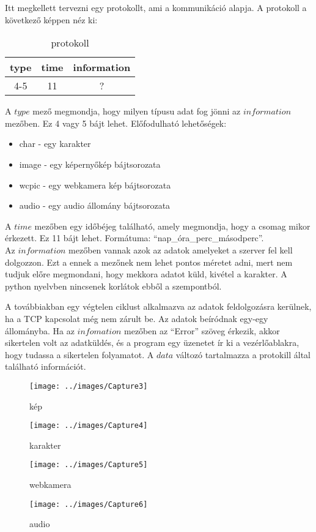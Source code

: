 \documentclass[a4paper, 11pt]{article}
\begin{document}
Itt megkellett tervezni egy protokollt, ami a kommunikáció alapja. A protokoll a következő képpen néz ki:
\begin{table}[H]
\centering
\label{tab:protocol}
\caption{protokoll}
\begin{tabular}{|c|c|c|}
\hline
\textbf{type} & \textbf{time} & \textbf{information} \\
\hline
4-5 & 11 & ? \\
\hline
\end{tabular}
\end{table}
A $type$ mező megmondja, hogy milyen típusu adat fog jönni az $information$ mezőben. Ez 4 vagy 5 bájt lehet. Előfodulható lehetőségek:
\begin{itemize}
\item char - egy karakter
\item image - egy képernyőkép bájtsorozata
\item wcpic - egy webkamera kép bájtsorozata
\item audio - egy audio állomány bájtsorozata
\end{itemize}
A $time$ mezőben egy időbéjeg található, amely megmondja, hogy a csomag mikor érkezett. Ez 11 bájt lehet. Formátuma: ``nap\_óra\_perc\_másodperc''.\\
Az $information$ mezőben vannak azok az adatok amelyeket a szerver fel kell dolgozzon. Ezt a ennek a mezőnek nem lehet pontos méretet adni, mert nem tudjuk előre megmondani, hogy mekkora adatot küld, kivétel a karakter. A python nyelvben nincsenek korlátok ebből a szempontból.

A továbbiakban egy végtelen ciklust alkalmazva az adatok feldolgozásra kerülnek, ha a TCP kapcsolat még nem zárult be. Az adatok beíródnak egy-egy állományba. Ha az $infomation$ mezőben az ``Error'' szöveg érkezik, akkor sikertelen volt az adatküldés, és a program egy üzenetet ír ki a vezérlőablakra, hogy tudassa a sikertelen folyamatot. A $data$ változó tartalmazza a protokill által található információt.
\begin{figure}[H]
\centering
\texttt{[image: ../images/Capture3]}
\caption{kép}
\label{fig:imgprocess}
\end{figure}
\begin{figure}[H]
\centering
\texttt{[image: ../images/Capture4]}
\caption{karakter}
\label{fig:charprocess}
\end{figure}
\begin{figure}[H]
\centering
\texttt{[image: ../images/Capture5]}
\caption{webkamera}
\label{fig:webcamprocess}
\end{figure}
\begin{figure}[H]
\centering
\texttt{[image: ../images/Capture6]}
\caption{audio}
\label{fig:audioprocess}
\end{figure}
\end{document}
